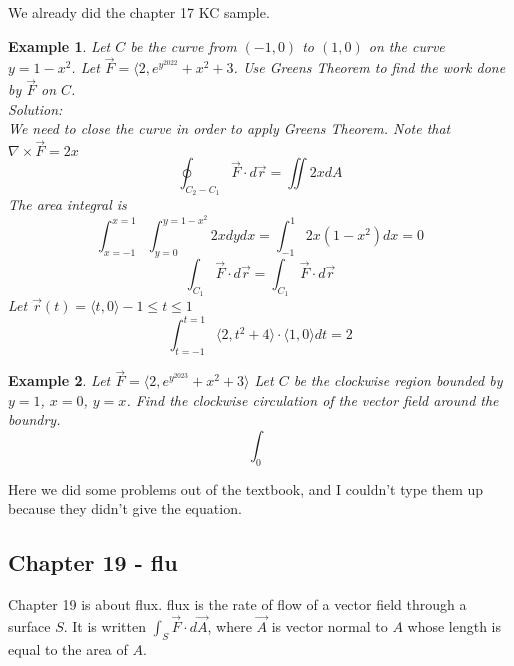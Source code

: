 \documentclass[11pt]{article}
\newtheorem{ex}{Example}
\begin{document}
  We already did the chapter 17 KC sample.
  \begin{ex}
    Let $C$ be the curve from $(-1,0)$ to $(1, 0)$ on the curve $y=  1-x^{2}$.
    Let $\vec{F} = \langle 2, e^{y^{2022}} + x^{2} + 3$. Use Greens Theorem to
    find the work done by $\vec{F}$ on $C$. \\
    Solution: \\
    We need to close the curve in order to apply Greens Theorem.
    Note that $\nabla \times \vec{F} = 2x$
    \[\oint_{C_{2}-C_{1}} \vec{F} \cdot d\vec{r} = \iint 2x dA  \]
    The area integral is
    \[\int_{x=-1}^{x=1} \int_{y=0}^{y=1-x^{2}} 2x dy dx = \int_{-1}^{1} 2x(1-x^{2}) dx = 0\]
    \[\int_{C_{1}} \vec{F} \cdot d\vec{r} =\int_{C_{1}} \vec{F} \cdot d\vec{r} \]
    Let $\vec{r}(t) = \langle t, 0 \rangle -1 \le t \le 1$
    \[\int_{t=-1}^{t=1} \langle 2, t^{2} + 4 \rangle \cdot \langle 1, 0 \rangle dt = 2 \]
  \end{ex}

  \begin{ex}
    Let $\vec{F} = \langle 2 , e^{y^{2023}} + x^{2} + 3 \rangle $
    Let $C$ be the clockwise region bounded by $y=1$, $x=0$, $y=x$.
    Find the clockwise circulation of the vector field around the boundry.
    \[\int_{0}\]
  \end{ex}



  Here we did some problems out of the textbook, and I couldn't type
  them up because they didn't give the equation.
  \subsection{Chapter 19 - flu}
  Chapter 19 is about flux.
  flux is the rate of flow of a vector field through a surface $S$. It is
  written $\int_{S} \vec{F} \cdot d\vec{A}$, where $\vec{A}$ is vector normal
  to $A$ whose length is equal to the area of $A$.
\end{document}
